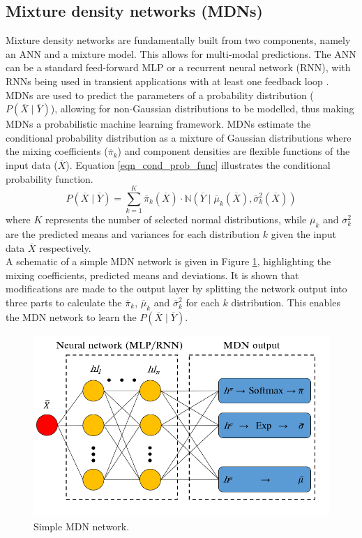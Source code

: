\documentclass[a4paper,fleqn]{cas-sc}
\begin{document}
\subsection{Mixture density networks (MDNs)}
Mixture density networks are fundamentally built from two components, namely an ANN and a mixture model. This allows for multi-modal predictions. The ANN can be a standard feed-forward MLP or a recurrent neural network (RNN), with RNNs being used in transient applications with at least one feedback loop \citep{Oko2015}.\\

MDNs are used to predict the parameters of a probability distribution ($P(\overline{X}\mid\overline{Y})$), allowing for non-Gaussian distributions to be modelled, thus making MDNs a probabilistic machine learning framework. MDNs estimate the conditional probability distribution as a mixture of Gaussian distributions where the mixing coefficients ($\overline{\pi}_k$) and component densities are flexible functions of the input data ($\overline{X}$). Equation \ref{eqn_cond_prob_func} illustrates the conditional probability function.
\begin{equation}\label{eqn_cond_prob_func}
P(\overline{X}\mid\overline{Y}) = \sum_{k=1}^K\overline{\pi}_k(\overline{X})\cdot \mathbb{N}(\overline{Y}\mid \overline{\mu}_k(\overline{X}),\overline{\sigma}^2_k(\overline{X}))
\end{equation}
where $K$ represents the number of selected normal distributions, while $\overline{\mu}_k$ and $\overline{\sigma}^2_k$ are the predicted means and variances for each distribution $k$ given the input data $\overline{X}$ respectively.\\

A schematic of a simple MDN network is given in Figure \ref{fig_mdn_schematic}, highlighting the mixing coefficients, predicted means and deviations. It is shown that modifications are made to the output layer by splitting the network output into three parts to calculate the $\overline{\pi}_k$, $\overline{\mu}_k$ and $\overline{\sigma}^2_k$ for each $k$ distribution. This enables the MDN network to learn the $P(\overline{X}\mid\overline{Y})$.\\
\begin{figure}[h!]
	\centering
		\includegraphics[scale=0.5]{MDN_SCHEMATIC}
	  \caption{Simple MDN network.}\label{fig_mdn_schematic}
\end{figure}
\end{document}
